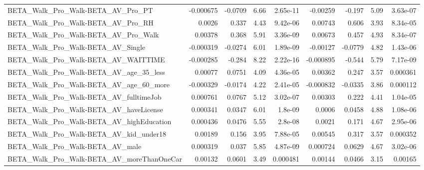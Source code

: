 \begin{tabular}{lrrrrrrrr}
BETA\_Walk\_Pro\_Walk-BETA\_AV\_Pro\_PT                  &   -0.000675 &      -0.0709 &     6.66 & 2.65e-11 &   -0.00259 &      -0.197 &         5.09 &      3.63e-07 \\
BETA\_Walk\_Pro\_Walk-BETA\_AV\_Pro\_RH                  &      0.0026 &        0.337 &     4.43 & 9.42e-06 &    0.00743 &       0.606 &         3.93 &      8.34e-05 \\
BETA\_Walk\_Pro\_Walk-BETA\_AV\_Pro\_Walk                &     0.00378 &        0.368 &     5.91 & 3.36e-09 &    0.00673 &       0.457 &         4.93 &      8.34e-07 \\
BETA\_Walk\_Pro\_Walk-BETA\_AV\_Single                  &   -0.000319 &      -0.0274 &     6.01 & 1.89e-09 &   -0.00127 &     -0.0779 &         4.82 &      1.43e-06 \\
BETA\_Walk\_Pro\_Walk-BETA\_AV\_WAITTIME                &   -0.000285 &       -0.284 &     8.22 & 2.22e-16 &  -0.000895 &      -0.544 &         5.79 &      7.17e-09 \\
BETA\_Walk\_Pro\_Walk-BETA\_AV\_age\_35\_less             &     0.00077 &       0.0751 &     4.09 & 4.36e-05 &    0.00362 &       0.247 &         3.57 &      0.000361 \\
BETA\_Walk\_Pro\_Walk-BETA\_AV\_age\_60\_more             &   -0.000329 &      -0.0174 &     4.22 & 2.41e-05 &  -0.000832 &     -0.0335 &         3.86 &      0.000112 \\
BETA\_Walk\_Pro\_Walk-BETA\_AV\_fulltimeJob             &    0.000761 &       0.0767 &     5.12 & 3.02e-07 &    0.00303 &       0.222 &         4.41 &      1.04e-05 \\
BETA\_Walk\_Pro\_Walk-BETA\_AV\_haveLicense             &    0.000341 &       0.0347 &     6.01 &  1.8e-09 &     0.0006 &      0.0458 &         4.88 &      1.08e-06 \\
BETA\_Walk\_Pro\_Walk-BETA\_AV\_highEducation           &    0.000436 &       0.0476 &     5.55 &  2.8e-08 &     0.0021 &       0.171 &         4.67 &      2.95e-06 \\
BETA\_Walk\_Pro\_Walk-BETA\_AV\_kid\_under18             &     0.00189 &        0.156 &     3.95 & 7.88e-05 &    0.00545 &       0.317 &         3.57 &      0.000352 \\
BETA\_Walk\_Pro\_Walk-BETA\_AV\_male                    &    0.000319 &        0.037 &     5.85 & 4.87e-09 &   0.000724 &      0.0629 &         4.67 &      3.02e-06 \\
BETA\_Walk\_Pro\_Walk-BETA\_AV\_moreThanOneCar          &     0.00132 &       0.0601 &     3.49 & 0.000481 &    0.00144 &      0.0466 &         3.15 &       0.00165 \\

\end{tabular}
